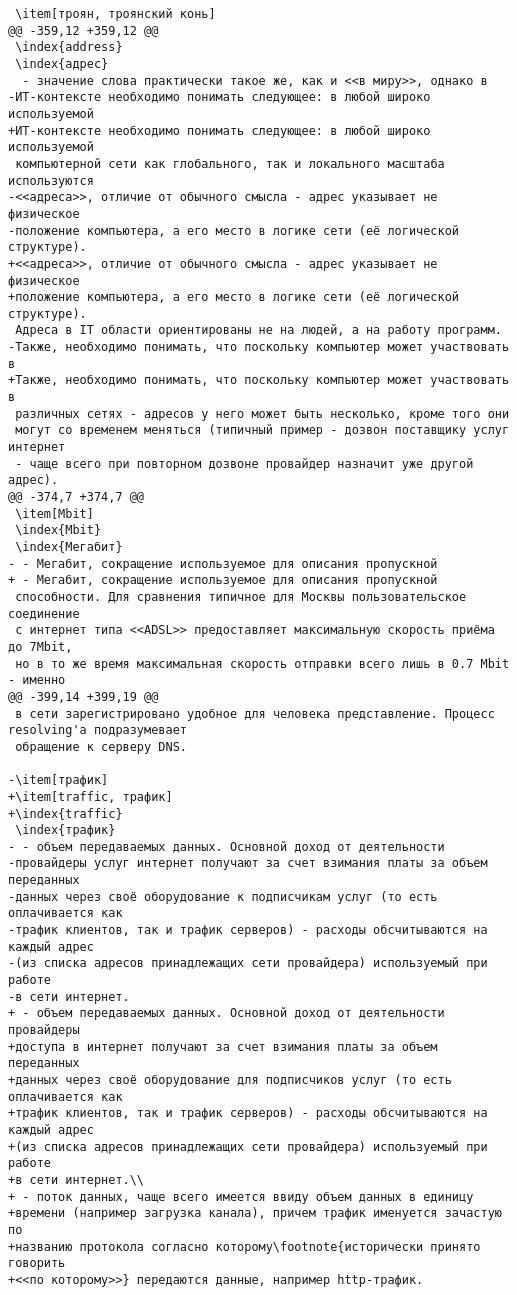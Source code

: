 \begin{verbatim}
 \item[троян, троянский конь]
@@ -359,12 +359,12 @@
 \index{address}
 \index{адрес}
  - значение слова практически такое же, как и <<в миру>>, однако в
-ИТ-контексте необходимо понимать следующее: в любой широко используемой
+ИТ-контексте необходимо понимать следующее: в любой широко используемой
 компьютерной сети как глобального, так и локального масштаба используются
-<<адреса>>, отличие от обычного смысла - адрес указывает не физическое
-положение компьютера, а его место в логике сети (её логической структуре).
+<<адреса>>, отличие от обычного смысла - адрес указывает не физическое
+положение компьютера, а его место в логике сети (её логической структуре).
 Адреса в IT области ориентированы не на людей, а на работу программ.
-Также, необходимо понимать, что поскольку компьютер может участвовать в
+Также, необходимо понимать, что поскольку компьютер может участвовать в
 различных сетях - адресов у него может быть несколько, кроме того они
 могут со временем меняться (типичный пример - дозвон поставщику услуг интернет
 - чаще всего при повторном дозвоне провайдер назначит уже другой адрес).
@@ -374,7 +374,7 @@
 \item[Mbit]
 \index{Mbit}
 \index{Мегабит}
- - Мегабит, сокращение используемое для описания пропускной
+ - Мегабит, сокращение используемое для описания пропускной
 способности. Для сравнения типичное для Москвы пользовательское соединение
 с интернет типа <<ADSL>> предоставляет максимальную скорость приёма до 7Mbit,
 но в то же время максимальная скорость отправки всего лишь в 0.7 Mbit - именно
@@ -399,14 +399,19 @@
 в сети зарегистрировано удобное для человека представление. Процесс resolving'а подразумевает
 обращение к серверу DNS.

-\item[трафик]
+\item[traffic, трафик]
+\index{traffic}
 \index{трафик}
- - объем передаваемых данных. Основной доход от деятельности
-провайдеры услуг интернет получают за счет взимания платы за объем переданных
-данных через своё оборудование к подписчикам услуг (то есть оплачивается как
-трафик клиентов, так и трафик серверов) - расходы обсчитываются на каждый адрес
-(из списка адресов принадлежащих сети провайдера) используемый при работе
-в сети интернет.
+ - объем передаваемых данных. Основной доход от деятельности провайдеры
+доступа в интернет получают за счет взимания платы за объем переданных
+данных через своё оборудование для подписчиков услуг (то есть оплачивается как
+трафик клиентов, так и трафик серверов) - расходы обсчитываются на каждый адрес
+(из списка адресов принадлежащих сети провайдера) используемый при работе
+в сети интернет.\\
+ - поток данных, чаще всего имеется ввиду объем данных в единицу
+времени (например загрузка канала), причем трафик именуется зачастую по
+названию протокола согласно которому\footnote{исторически принято говорить
+<<по которому>>} передаются данные, например http-трафик.


\end{verbatim}
